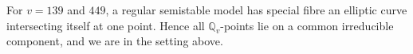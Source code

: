 \documentclass[11pt]{amsart}
\def\Q{\mathbb Q}
\theoremstyle{plain}
\theoremstyle{definition}
\newcommand{\dR}{\mathrm{dR}}
\newcommand{\Div}{\mathrm{Div}}
\newcommand{\Sym}{\mathrm{Sym}}
\newcommand{\aff}{\mathrm{aff}}
\newcommand{\Ker}{\mathrm{Ker}}
\begin{document}
For $v=139$ and $449$, a regular semistable model has special fibre an elliptic curve intersecting itself at one point. Hence all $\Q _v$-points lie on a common irreducible component, and we are in the setting above.

\end{document}
